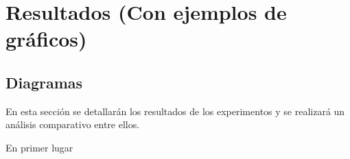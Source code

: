
\chapter{Resultados (Con ejemplos de gráficos)}
\label{resultados}

\section{Diagramas}


  En esta sección se detallarán los resultados de los experimentos y se realizará un análisis comparativo entre ellos.


  En primer lugar














